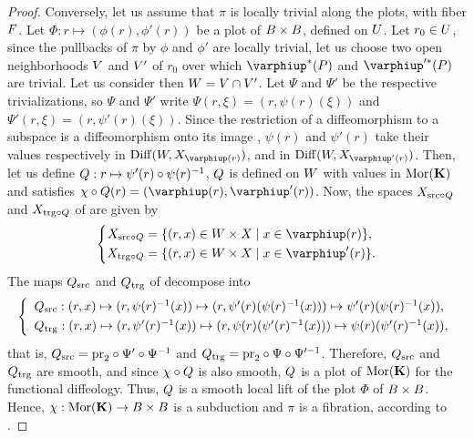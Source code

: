 \begin{proof}
  Conversely,
  let us assume that $\pi$ is locally trivial along the plots,
  with fiber $F$.
  Let $\Phi : r \mapsto (\phi(r), \phi'(r))$ be a plot of $B \times B$,
  defined on $U$.
  Let $r_0 \in U$,
  since the pullbacks of $\pi$ by $\phi$ and $\phi'$ are locally trivial,
  let us choose two open neighborhoods $V$ and $V'$ of $r_0$ over which $\phi^*(\P)$ and $\phi'^*(\P)$ are trivial.
  Let us consider then $W = V \cap V'$.
  Let $\Psi$ and $\Psi'$ be the respective trivializations,
  so $\Psi$ and $\Psi'$ write $\Psi(r,\xi) = (r, \psi(r)(\xi))$ and $\Psi'(r,\xi) = (r, \psi'(r)(\xi))$.
  Since the restriction of a diffeomorphism to a subspace is a diffeomorphism onto its image ,
  $\psi(r)$ and $\psi'(r)$ take their values respectively in $\Diff(\W, \X_{\phi(r)})$,
  and in $\Diff(\W, \X_{\phi'(r)})$.
  Then,
  let us define $Q : r \mapsto \psi'(r) \circ \psi(r)^{-1}$,
  $Q$ is defined on $W$ with values in ${\operatorname{Mor}}({\mathbf K})$ and satisfies $\car \circ \Q(r) = (\phi(r),\phi'(r))$.
  Now,
  the spaces $X_{{\operatorname{src}} \circ Q}$ and $X_{{\operatorname{trg}} \circ Q}$ of  are given by
  $$%
  \left\{
  \begin{aligned}
    \X_{\source \circ \Q} & = \{(r,x) \in \W \times \X \mid x \in \phi(r) \}, \\
    \X_{\target \circ \Q} & = \{(r,x) \in \W \times \X \mid x \in \phi'(r) \}.
  \end{aligned}
  \right.
  $$%
  The maps $Q_{\operatorname{src}}$ and $Q_{\operatorname{trg}}$ of  decompose into
  $$%
  \left\{
  \begin{array}{l}
    \Q_\source : (r,x) \mapsto (r,\psi(r)^{-1}(x)) \mapsto (r,\psi'(r)(\psi(r)^{-1}(x))) \mapsto \psi'(r)(\psi(r)^{-1}(x)), \\[.8ex]
    \Q_\target : (r,x) \mapsto (r,\psi'(r)^{-1}(x)) \mapsto (r,\psi(r)(\psi'(r)^{-1}(x))) \mapsto \psi(r)(\psi'(r)^{-1}(x)),
  \end{array}
  \right.
  $$%
  that is,
  $Q_{\operatorname{src}} = \mathrm{pr}_2 \circ \Psi' \circ \Psi^{-1}$ and $Q_{\operatorname{trg}} = \mathrm{pr}_2 \circ \Psi \circ \Psi'^{-1}$.
  Therefore,
  $Q_{\operatorname{src}}$ and $Q_{\operatorname{trg}}$ are smooth,
  and since $\chi \circ Q$ is also smooth,
  $Q$ is a plot of ${\operatorname{Mor}}({\mathbf K})$ for the functional diffeology.
  Thus,
  $Q$ is a smooth local lift of the plot $\Phi$ of $B \times B$.
  Hence,
  $\chi : {\operatorname{Mor}}({\mathbf K}) \to B \times B$ is a subduction and $\pi$ is a fibration,
  according to .
\end{proof}

